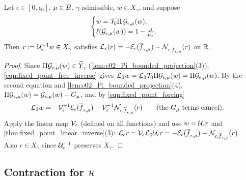 \begin{lemma}
  \label{lem:c02_system_implies_correction}
  Let $\epsilon\in[0,\epsilon_0]$, $\mu\in\overline{B}$, $\gamma$ admissible, $w\in X_\gamma$, and suppose
  \begin{equation}\label{eqn:fixed_point_system}
    \begin{cases} w=\mathcal{T}_0\Pi\,\mathcal{G}_{\epsilon,\mu}(w),\\ \ell(\mathcal{G}_{\epsilon,\mu}(w))=1-\frac{\mu}{\mu_*}.\end{cases}
  \end{equation}
  Then $r:=\mathcal{U}_\epsilon^{-1}w\in X_\gamma$ satisfies $\mathcal{L}_\epsilon(r)=-\mathcal{E}_\epsilon(\overline{f}_{\epsilon,\mu})-\mathcal{N}_{\epsilon,\overline{f}_{\epsilon,\mu}}(r)$ on $\mathbb{R}$.
\end{lemma}
\begin{proof}
  Since $\Pi\mathcal{G}_{\epsilon,\mu}(w)\in\widetilde{Y}_\gamma$ (\cref{lem:c02_Pi_bounded_projection}(3)), \eqref{eqn:fixed_point_free_inverse} gives
  $\mathcal{L}_0w=\mathcal{L}_0\mathcal{T}_0\Pi\mathcal{G}_{\epsilon,\mu}(w)=\Pi\mathcal{G}_{\epsilon,\mu}(w)$. By the second equation and
  \cref{lem:c02_Pi_bounded_projection}(4), $\Pi\mathcal{G}_{\epsilon,\mu}(w)=\mathcal{G}_{\epsilon,\mu}(w)-G_\mu$, and by \eqref{eqn:fixed_point_forcing}
  \[
    \mathcal{L}_0 w=-\mathcal{V}_\epsilon^{-1}\mathcal{E}_\epsilon(\overline{f}_{\epsilon,\mu})-\mathcal{V}_\epsilon^{-1}\mathcal{N}_{\epsilon,\overline{f}_{\epsilon,\mu}}(r)
    \qquad(\text{the }G_\mu\text{ terms cancel}).
  \]
  Apply the linear map $\mathcal{V}_\epsilon$ (defined on all functions) and use $w=\mathcal{U}_\epsilon r$ and
  \cref{thm:fixed_point_linear_inverse}(3): $\mathcal{L}_\epsilon r=\mathcal{V}_\epsilon\mathcal{L}_0\mathcal{U}_\epsilon r=-\mathcal{E}_\epsilon(\overline{f}_{\epsilon,\mu})-\mathcal{N}_{\epsilon,\overline{f}_{\epsilon,\mu}}(r)$.
  Also $r\in X_\gamma$ since $\mathcal{U}_\epsilon^{-1}$ preserves $X_\gamma$.
\end{proof}

\subsection{Contraction for $\mathcal{H}$}

